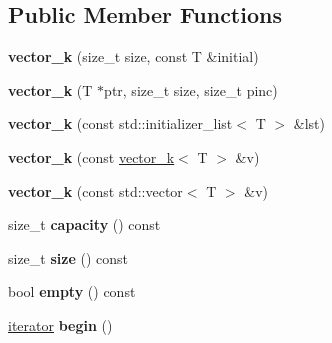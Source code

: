 \subsection*{Public Member Functions}
\begin{DoxyCompactItemize}
\item 
\hypertarget{classkeycpp_1_1vector__k_a1f65dfce13d605312c497195081b71fa}{{\bfseries vector\-\_\-k} (size\-\_\-t size, const T \&initial)}\label{classkeycpp_1_1vector__k_a1f65dfce13d605312c497195081b71fa}

\item 
\hypertarget{classkeycpp_1_1vector__k_a6902434fbd3b5ebbbedc1b068c3df3ec}{{\bfseries vector\-\_\-k} (T $\ast$ptr, size\-\_\-t size, size\-\_\-t pinc)}\label{classkeycpp_1_1vector__k_a6902434fbd3b5ebbbedc1b068c3df3ec}

\item 
\hypertarget{classkeycpp_1_1vector__k_a5b6df14409684df91f883c3bb33204f5}{{\bfseries vector\-\_\-k} (const std\-::initializer\-\_\-list$<$ T $>$ \&lst)}\label{classkeycpp_1_1vector__k_a5b6df14409684df91f883c3bb33204f5}

\item 
\hypertarget{classkeycpp_1_1vector__k_a694c6c797022382b57e2d51350e39afc}{{\bfseries vector\-\_\-k} (const \hyperlink{classkeycpp_1_1vector__k}{vector\-\_\-k}$<$ T $>$ \&v)}\label{classkeycpp_1_1vector__k_a694c6c797022382b57e2d51350e39afc}

\item 
\hypertarget{classkeycpp_1_1vector__k_a5e130370253f66d9968c35d41228bef4}{{\bfseries vector\-\_\-k} (const std\-::vector$<$ T $>$ \&v)}\label{classkeycpp_1_1vector__k_a5e130370253f66d9968c35d41228bef4}

\item 
\hypertarget{classkeycpp_1_1vector__k_a651efbae7ea28e3e4cc3a07375a8de72}{size\-\_\-t {\bfseries capacity} () const }\label{classkeycpp_1_1vector__k_a651efbae7ea28e3e4cc3a07375a8de72}

\item 
\hypertarget{classkeycpp_1_1vector__k_a829c7caf8f696e161375d18b715c918a}{size\-\_\-t {\bfseries size} () const }\label{classkeycpp_1_1vector__k_a829c7caf8f696e161375d18b715c918a}

\item 
\hypertarget{classkeycpp_1_1vector__k_abbba6e3a7e0dc425a78645f78417c62c}{bool {\bfseries empty} () const }\label{classkeycpp_1_1vector__k_abbba6e3a7e0dc425a78645f78417c62c}

\item 
\hypertarget{classkeycpp_1_1vector__k_ad70ec20714961768933f3dcf59ec7817}{\hyperlink{classkeycpp_1_1_pointer_iterator}{iterator} {\bfseries begin} ()}\label{classkeycpp_1_1vector__k_ad70ec20714961768933f3dcf59ec7817}


\end{DoxyCompactItemize}

